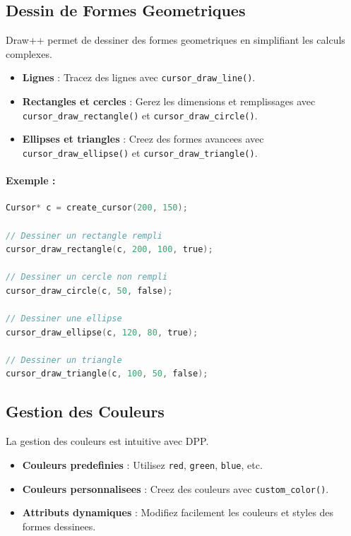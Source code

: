 \documentclass[12pt,a4paper]{report}
\begin{document}
\subsection{Dessin de Formes Geometriques}
Draw++ permet de dessiner des formes geometriques en simplifiant les calculs complexes.

\begin{itemize}
    \item \textbf{Lignes} : Tracez des lignes avec \texttt{cursor\_draw\_line()}.
    \item \textbf{Rectangles et cercles} : Gerez les dimensions et remplissages avec \texttt{cursor\_draw\_rectangle()} et \texttt{cursor\_draw\_circle()}.
    \item \textbf{Ellipses et triangles} : Creez des formes avancees avec \texttt{cursor\_draw\_ellipse()} et \texttt{cursor\_draw\_triangle()}.
\end{itemize}

\paragraph{Exemple :}
\begin{lstlisting}[language=C]
Cursor* c = create_cursor(200, 150);

// Dessiner un rectangle rempli
cursor_draw_rectangle(c, 200, 100, true);

// Dessiner un cercle non rempli
cursor_draw_circle(c, 50, false);

// Dessiner une ellipse
cursor_draw_ellipse(c, 120, 80, true);

// Dessiner un triangle
cursor_draw_triangle(c, 100, 50, false);
\end{lstlisting}

\subsection{Gestion des Couleurs}
La gestion des couleurs est intuitive avec DPP.

\begin{itemize}
    \item \textbf{Couleurs predefinies} : Utilisez \texttt{red}, \texttt{green}, \texttt{blue}, etc.
    \item \textbf{Couleurs personnalisees} : Creez des couleurs avec \texttt{custom\_color()}.
    \item \textbf{Attributs dynamiques} : Modifiez facilement les couleurs et styles des formes dessinees.
\end{itemize}
\end{document}
